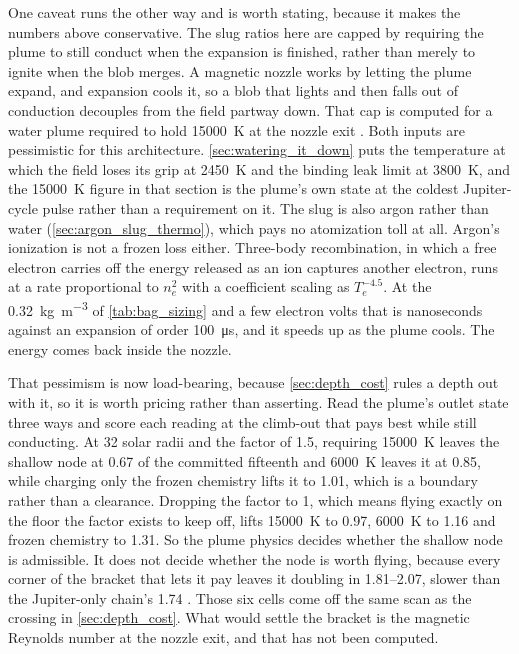 \documentclass{article}
\begin{document}
One caveat runs the other way and is worth stating, because it makes the numbers above conservative. The slug ratios here are capped by requiring the plume to still conduct when the expansion is finished, rather than merely to ignite when the blob merges. A magnetic nozzle works by letting the plume expand, and expansion cools it, so a blob that lights and then falls out of conduction decouples from the field partway down. That cap is computed for a water plume required to hold \SI{15000}{\kelvin} at the nozzle exit \cite{Katz_aim_is_all_you_need_2025}. Both inputs are pessimistic for this architecture. \autoref{sec:watering_it_down} puts the temperature at which the field loses its grip at \SI{2450}{\kelvin} and the binding leak limit at \SI{3800}{\kelvin}, and the \SI{15000}{\kelvin} figure in that section is the plume's own state at the coldest Jupiter-cycle pulse rather than a requirement on it. The slug is also argon rather than water (\autoref{sec:argon_slug_thermo}), which pays no atomization toll at all. Argon's ionization is not a frozen loss either. Three-body recombination, in which a free electron carries off the energy released as an ion captures another electron, runs at a rate proportional to $n_e^2$ with a coefficient scaling as $T_e^{-4.5}$. At the \SI{0.32}{\kilogram\per\cubic\meter} of \autoref{tab:bag_sizing} and a few electron volts that is nanoseconds against an expansion of order \SI{100}{\micro\second}, and it speeds up as the plume cools. The energy comes back inside the nozzle.

That pessimism is now load-bearing, because \autoref{sec:depth_cost} rules a depth out with it, so it is worth pricing rather than asserting. Read the plume's outlet state three ways and score each reading at the climb-out that pays best while still conducting. At 32 solar radii and the factor of 1.5, requiring \SI{15000}{\kelvin} leaves the shallow node at \num{0.67} of the committed fifteenth and \SI{6000}{\kelvin} leaves it at \num{0.85}, while charging only the frozen chemistry lifts it to \num{1.01}, which is a boundary rather than a clearance. Dropping the factor to 1, which means flying exactly on the floor the factor exists to keep off, lifts \SI{15000}{\kelvin} to \num{0.97}, \SI{6000}{\kelvin} to \num{1.16} and frozen chemistry to \num{1.31}. So the plume physics decides whether the shallow node is admissible. It does not decide whether the node is worth flying, because every corner of the bracket that lets it pay leaves it doubling in \SIrange{1.81}{2.07}{\year}, slower than the Jupiter-only chain's \SI{1.74}{\year} \cite{Katz_aim_is_all_you_need_2025}. Those six cells come off the same scan as the crossing in \autoref{sec:depth_cost}. What would settle the bracket is the magnetic Reynolds number at the nozzle exit, and that has not been computed.
\end{document}

